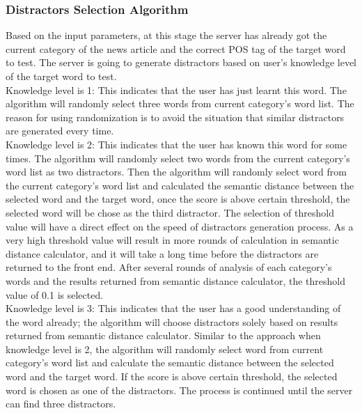 \subsubsection{Distractors Selection Algorithm}
Based on the input parameters, at this stage the server has already got the current category of the news article and the correct POS tag of the target word to test. The server is going to generate distractors based on user’s knowledge level of the target word to test.
\\
Knowledge level is 1: This indicates that the user has just learnt this word. The algorithm will randomly select three words from current category’s word list. The reason for using randomization is to avoid the situation that similar distractors are generated every time.
\\
Knowledge level is 2: This indicates that the user has known this word for some times. The algorithm will randomly select two words from the current category’s word list as two distractors. Then the algorithm will randomly select word from the current category’s word list and calculated the semantic distance between the selected word and the target word, once the score is above certain threshold, the selected word will be chose as the third distractor. The selection of threshold value will have a direct effect on the speed of distractors generation process. As a very high threshold value will result in more rounds of calculation in semantic distance calculator, and it will take a long time before the distractors are returned to the front end. After several rounds of analysis of each category’s words and the results returned from semantic distance calculator, the threshold value of 0.1 is selected.
\\
Knowledge level is 3: This indicates that the user has a good understanding of the word already; the algorithm will choose distractors solely based on results returned from semantic distance calculator. Similar to the approach when knowledge level is 2, the algorithm will randomly select word from current category’s word list and calculate the semantic distance between the selected word and the target word. If the score is above certain threshold, the selected word is chosen as one of the distractors. The process is continued until the server can find three distractors. 
\\